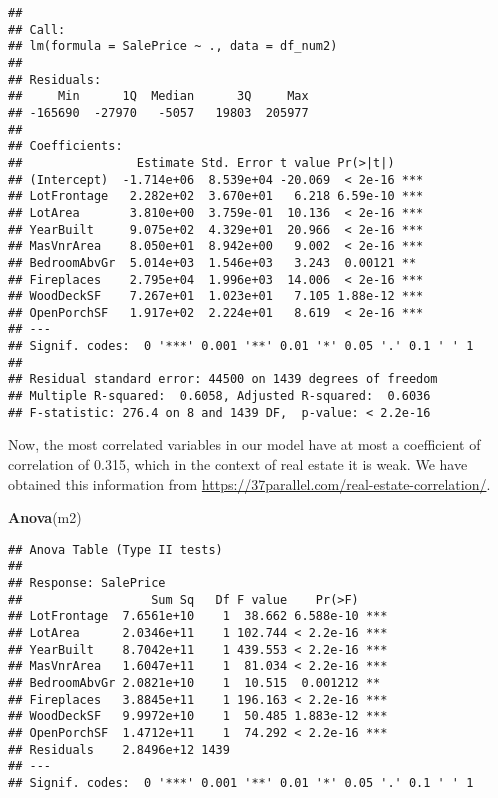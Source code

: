 \documentclass[
]{article}
\newenvironment{Shaded}{\begin{snugshade}}{\end{snugshade}}
\newcommand{\FunctionTok}[1]{\textcolor[rgb]{0.13,0.29,0.53}{\textbf{#1}}}
\newcommand{\NormalTok}[1]{#1}
\begin{document}
\begin{verbatim}
## 
## Call:
## lm(formula = SalePrice ~ ., data = df_num2)
## 
## Residuals:
##     Min      1Q  Median      3Q     Max 
## -165690  -27970   -5057   19803  205977 
## 
## Coefficients:
##                Estimate Std. Error t value Pr(>|t|)    
## (Intercept)  -1.714e+06  8.539e+04 -20.069  < 2e-16 ***
## LotFrontage   2.282e+02  3.670e+01   6.218 6.59e-10 ***
## LotArea       3.810e+00  3.759e-01  10.136  < 2e-16 ***
## YearBuilt     9.075e+02  4.329e+01  20.966  < 2e-16 ***
## MasVnrArea    8.050e+01  8.942e+00   9.002  < 2e-16 ***
## BedroomAbvGr  5.014e+03  1.546e+03   3.243  0.00121 ** 
## Fireplaces    2.795e+04  1.996e+03  14.006  < 2e-16 ***
## WoodDeckSF    7.267e+01  1.023e+01   7.105 1.88e-12 ***
## OpenPorchSF   1.917e+02  2.224e+01   8.619  < 2e-16 ***
## ---
## Signif. codes:  0 '***' 0.001 '**' 0.01 '*' 0.05 '.' 0.1 ' ' 1
## 
## Residual standard error: 44500 on 1439 degrees of freedom
## Multiple R-squared:  0.6058, Adjusted R-squared:  0.6036 
## F-statistic: 276.4 on 8 and 1439 DF,  p-value: < 2.2e-16
\end{verbatim}

Now, the most correlated variables in our model have at most a
coefficient of correlation of 0.315, which in the context of real estate
it is weak. We have obtained this information from
\url{https://37parallel.com/real-estate-correlation/}.

\begin{Shaded}
\begin{Highlighting}[]
\FunctionTok{Anova}\NormalTok{(m2)}
\end{Highlighting}
\end{Shaded}

\begin{verbatim}
## Anova Table (Type II tests)
## 
## Response: SalePrice
##                  Sum Sq   Df F value    Pr(>F)    
## LotFrontage  7.6561e+10    1  38.662 6.588e-10 ***
## LotArea      2.0346e+11    1 102.744 < 2.2e-16 ***
## YearBuilt    8.7042e+11    1 439.553 < 2.2e-16 ***
## MasVnrArea   1.6047e+11    1  81.034 < 2.2e-16 ***
## BedroomAbvGr 2.0821e+10    1  10.515  0.001212 ** 
## Fireplaces   3.8845e+11    1 196.163 < 2.2e-16 ***
## WoodDeckSF   9.9972e+10    1  50.485 1.883e-12 ***
## OpenPorchSF  1.4712e+11    1  74.292 < 2.2e-16 ***
## Residuals    2.8496e+12 1439                      
## ---
## Signif. codes:  0 '***' 0.001 '**' 0.01 '*' 0.05 '.' 0.1 ' ' 1
\end{verbatim}
\end{document}
